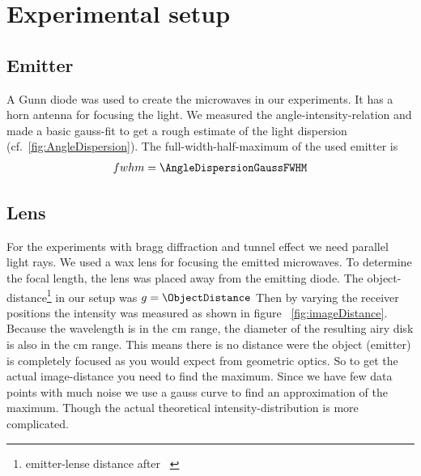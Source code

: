 \documentclass[a4paper,10pt,twocolumn]{article}
\begin{document}
    \section{Experimental setup}
    \subsection{Emitter}
    A Gunn diode was used to create the microwaves in our experiments. 
    It has a horn antenna for focusing the light.
    We measured the angle-intensity-relation and made a basic gauss-fit to get a rough estimate of the light dispersion (cf.~\ref{fig:AngleDispersion}).
    The full-width-half-maximum of the used emitter is
    \begin{align*}
        fwhm = \AngleDispersionGaussFWHM
    \end{align*}



    \subsection{Lens}
    For the experiments with bragg diffraction and tunnel effect we need parallel light rays.
    We used a wax lens for focusing the emitted microwaves.
    To determine the focal length, the lens was placed away from the emitting diode.
    The object-distance\footnote{emitter-lense distance after ~\cite{pasco}} in our setup was $g = \ObjectDistance$
    Then by varying the receiver positions the intensity was measured as shown in figure ~\ref{fig:imageDistance}. 
    Because the wavelength is in the cm range, the diameter of the resulting airy disk is also in the cm range.
    This means there is no distance were the object (emitter) is completely focused as you would expect from geometric optics.
    So to get the actual image-distance you need to find the maximum.
    Since we have few data points with much noise we use a gauss curve to find an approximation of the maximum.
    Though the actual theoretical intensity-distribution is more complicated.
    
    
    
\end{document}
